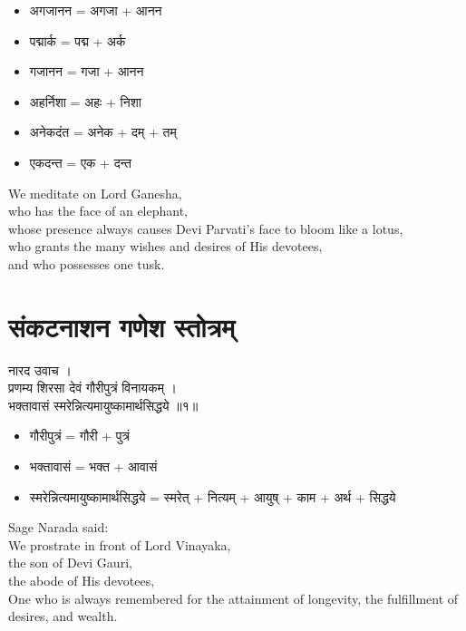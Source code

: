 \documentclass{book}
\newenvironment{Verse}[1][]
  {\bigskip\noindent\begin{center}\begin{adjustbox}{valign=M}\begin{tcolorbox}[colframe=black,colback=white,boxrule=0.5mm,arc=4mm,auto outer arc,left=2mm,right=2mm,top=2mm,bottom=2mm,halign=center]
  \LARGE\bfseries#1\par\varwidth{\linewidth}\centering}
  {\endvarwidth\end{tcolorbox}\end{adjustbox}\end{center}\bigskip}
\begin{document}
\begin{multicols}{2}
    \setlength{\columnseprule}{0.4pt}
    \begin{itemize}
        \item अगजानन = अगजा + आनन
        \item पद्मार्क = पद्म + अर्क
        \item गजानन = गजा + आनन
        \item अहर्निशा = अहः + निशा
        \item अनेकदंत = अनेक + दम्  + तम्
        \item एकदन्त = एक + दन्त
    \end{itemize}

    \columnbreak
    
    \vspace{10pt}
    \textenglish{
        \noindent We meditate on Lord Ganesha,\\
        who has the face of an elephant,\\
        whose presence always causes Devi Parvati's face to bloom like a lotus,\\
        who grants the many wishes and desires of His devotees,\\
        and who possesses one tusk.
    }

\end{multicols}

\clearpage

\section{संकटनाशन गणेश स्तोत्रम्}

\begin{Verse}
    नारद उवाच ।\\
    प्रणम्य शिरसा देवं गौरीपुत्रं विनायकम् ।\\
    भक्तावासं स्मरेन्नित्यमायुष्कामार्थसिद्धये ॥१॥
\end{Verse}


\begin{multicols}{2}
    \setlength{\columnseprule}{0.4pt}
    \begin{itemize}
        \item गौरीपुत्रं = गौरी + पुत्रं
        \item भक्तावासं = भक्त + आवासं
        \item स्मरेन्नित्यमायुष्कामार्थसिद्धये = स्मरेत् + नित्यम् + आयुष् + काम + अर्थ + सिद्धये
    \end{itemize}

    \columnbreak
    
    \vspace{10pt}
    \textenglish{
        \noindent Sage Narada said:\\
        We prostrate in front of Lord Vinayaka,\\
        the son of Devi Gauri,\\
        the abode of His devotees,\\
        One who is always remembered for the attainment of longevity, the fulfillment of desires, and wealth.
    }

\end{multicols}
\end{document}
